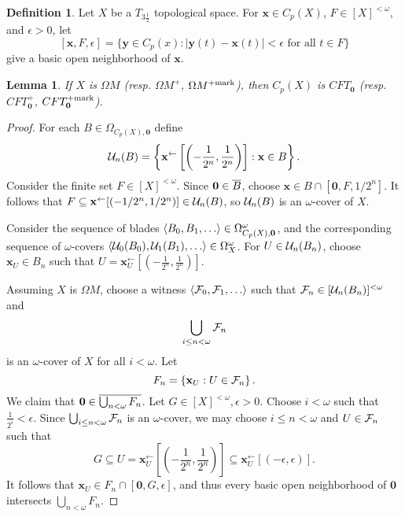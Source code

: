 \documentclass{amsart}
\renewcommand{\vec}{\mathbf}
\theoremstyle{plain}
\newtheorem{lemma}[theorem]{Lemma}
\theoremstyle{definition}
\newtheorem{definition}[theorem]{Definition}
\theoremstyle{remark}
\theoremstyle{plain}
\theoremstyle{definition}
\theoremstyle{remark}
\begin{document}
\begin{definition}
  Let \(X\) be a \(T_{3\frac{1}{2}}\) topological space.
  For \(\vec x\in C_p(X)\), \(F\in[X]^{<\omega}\), and
  \(\epsilon>0\), let
  \[
    [\vec x,F,\epsilon]
      =
    \{
      \vec y\in C_p(x)
    :
      |\vec y(t)-\vec x(t)|<\epsilon
    \text{ for all }
      t\in F
    \}
  \]
  give a basic open neighborhood of \(\vec x\).
\end{definition}

\begin{lemma}\label{mengerFanLemma1}
  If \(X\) is \(\Omega M\)
  (resp. \(\Omega M^+\), \(\Omega M^{+\mathrm{mark}}\)),
  then \(C_p(X)\) is \(CFT_{\vec 0}\)
  (resp. \(CFT_{\vec 0}^+\), \(CFT_{\vec 0}^{\plusMark}\)).
\end{lemma}

\begin{proof}
  For each \(B\in\Omega_{C_p(X),\vec 0}\) define
  \[
    \mc U_n(B)
      =
    \left\{
      \vec x^{\leftarrow}\left[\left(-\frac{1}{2^n},\frac{1}{2^n}\right)\right]
    :
      \vec x\in B
    \right\}
  .\]
  Consider the finite set \(F\in[X]^{<\omega}\). Since
  \(\vec 0\in\cl B\), choose \(\vec x\in B\cap[\vec 0,F,1/2^n]\).
  It follows that
  \(F\subseteq \vec x^{\leftarrow}[(-1/2^n,1/2^n)]\in\mc U_n(B)\),
  so \(\mathcal{U}_n(B)\) is an \(\omega\)-cover of \(X\).

  Consider the sequence of blades
  \(\<B_0,B_1,\dots\>\in\Omega_{C_p(X),\vec 0}^\omega\), and the
  corresponding sequence of \(\omega\)-covers
  \(\<\mc U_0(B_0),\mc U_1(B_1),\dots\>\in \Omega_X^\omega\).
  For \(U\in\mathcal{U}_n(B_n)\), choose \(\vec x_U\in B_n\) such that
  \(
    U
      =
    \vec x_U^{\leftarrow}\left[\left(-\frac{1}{2^n},\frac{1}{2^n}\right)\right]
  \).

  Assuming \(X\) is \(\Omega M\), choose a witness
  \(\<\mc F_0,\mc F_1,\dots\>\) such that
  \(\mathcal{F}_n\in[\mathcal{U}_n(B_n)]^{<\omega}\) and
  \[
    \bigcup_{i\leq n<\omega} \mathcal{F}_n
  \]
  is an \(\omega\)-cover of \(X\) for all \(i<\omega\).
  Let
  \[
    F_n
      =
    \left\{
      \vec x_U
    :
      U
        \in
      \mc F_n
    \right\}
  .\]
  We claim that \(\vec 0\in\cl{\bigcup_{n<\omega}F_n}\).
  Let \(G\in[X]^{<\omega},\epsilon>0\). Choose \(i<\omega\) such that
  \(\frac{1}{2^i}<\epsilon\). Since \(\bigcup_{i\leq n<\omega} \mathcal{F}_n\)
  is an \(\omega\)-cover, we may choose
  \(i\leq n<\omega\) and
  \(U\in\mathcal{F}_n\)
  such that
  \[
    G
      \subseteq
    U
      =
    \vec x_U^{\leftarrow}\left[\left(-\frac{1}{2^n},\frac{1}{2^n}\right)\right]
      \subseteq
    \vec x_U^{\leftarrow}[(-\epsilon,\epsilon)]
  .\]
  It follows that \(\vec x_U\in F_n\cap[\vec 0,G,\epsilon]\), and thus
  every basic open neighborhood of \(\vec 0\) intersects
  \(\bigcup_{n<\omega}F_n\).


\end{proof}
\end{document}
